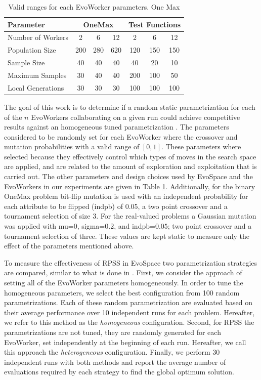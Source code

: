\documentclass{llncs}
\begin{document}
\begin{table}[!t]
\caption{Valid ranges for each EvoWorker parameters. One Max}
\label{tab:params}
\centering
\begin{tabular}{|l|c|c|c|c|c|c| }
\hline
\textbf{Parameter} & \multicolumn{3}{|c|}{OneMax} & \multicolumn{3}{|c|}{Test Functions} \\
\hline
Number of Workers & 2 & 6 & 12 & 2 & 6 & 12\\
\hline
\hline
Population Size & 200 & 280 & 620 & 120 & 150 & 150\\
\hline
Sample Size & 40 & 40 & 40 & 40 & 20 & 10\\
\hline
Maximum Samples & 30 & 40 & 40 & 200 & 100 & 50\\
\hline
Local Generations & 30 & 30 & 30 & 100 & 100 & 100\\
\hline
\end{tabular}
\end{table}
%
The goal of this work is to determine if a random static parametrization for each of the $n$ EvoWorkers 
collaborating on a given run could achieve competitive results against an homogeneous tuned parametrization
\cite{fuku1,fuku2,garcia2014randomized}. The parameters considered to be randomly set for each EvoWorker 
where the crossover and mutation probabilities with a valid range of $[0,1]$. These parameters where 
selected because they effectively control which types of moves in the search space are
applied, and are related to the amount of exploration and exploitation
that is carried out. %
The other parameters and design choices used by EvoSpace and the EvoWorkers in our experiments are given in 
Table \ref{tab:params}. Additionally, for the binary OneMax problem bit-flip mutation
is used with an independent probability for each attribute to be flipped (indpb) of $0.05$, 
a two point crossover and a tournament selection of size 3. For the real-valued problems a Gaussian
mutation was applied with mu=$0$, sigma=$0.2$, and indpb=$0.05$; two point crossover and
a tournament selection of three. These values are kept static to measure only the effect of the 
parameters mentioned above.



To measure the effectiveness of RPSS in EvoSpace two parametrization strategies are compared, 
similar to what is done in \cite{fuku1,fuku2,garcia2014randomized}. First, we consider the approach of setting all 
of the EvoWorker parameters homogeneously. In order to tune the homogeneous parameters,
we select the best configuration from 100 random parametrizations. 
Each of these random parametrization are evaluated based on their average performance over 10 
independent runs for each problem.
Hereafter, we refer to this method as the {\em homogeneous} configuration. Second, for RPSS the parametrizations
are not tuned, they are randomly generated for each EvoWorker, set independently at the beginning of each run.
Hereafter, we call this approach the {\em heterogeneous} configuration. Finally, we perform 30 independent runs
with both methods and report the average number of evaluations required by each strategy to find the
global optimum solution.
\end{document}

